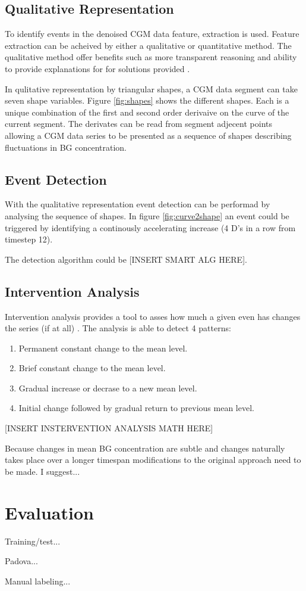

\subsection{Qualitative Representation}

To identify events in the denoised CGM data feature, extraction is used.
Feature extraction can be acheived by either a qualitative or quantitative method.
The qualitative method offer benefits such as more transparent reasoning and ability to provide explanations for for solutions provided \parencite{Ven2003}.

In qulitative representation by triangular shapes, a CGM data segment can take seven shape variables.
Figure \ref{fig:shapes} shows the different shapes.
Each is a unique combination of the first and second order derivaive on the curve of the current segment.
The derivates can be read from segment adjecent points allowing a CGM data series to be presented as a sequence of shapes describing fluctuations in BG concentration.



\subsection{Event Detection}

With the qualitative representation event detection can be performad by analysing the sequence of shapes.
In figure \ref{fig:curve2shape} an event could be triggered by identifying a continously accelerating increase (4 D's in a row from timestep 12).



The detection algorithm could be [INSERT SMART ALG HERE].

\subsection{Intervention Analysis}

Intervention analysis provides a tool to asses how much a given even has changes the series (if at all) \parencite{box2015time}.
The analysis is able to detect 4 patterns:

\begin{enumerate}
  \item Permanent constant change to the mean level.
  \item Brief constant change to the mean level.
  \item Gradual increase or decrase to a new mean level.
  \item Initial change followed by gradual return to previous mean level.
\end{enumerate}

[INSERT INSTERVENTION ANALYSIS MATH HERE]

Because changes in mean BG concentration are subtle and changes naturally takes place over a longer timespan modifications to the original approach need to be made.
I suggest...

\section{Evaluation}

Training/test...

Padova...

Manual labeling...
